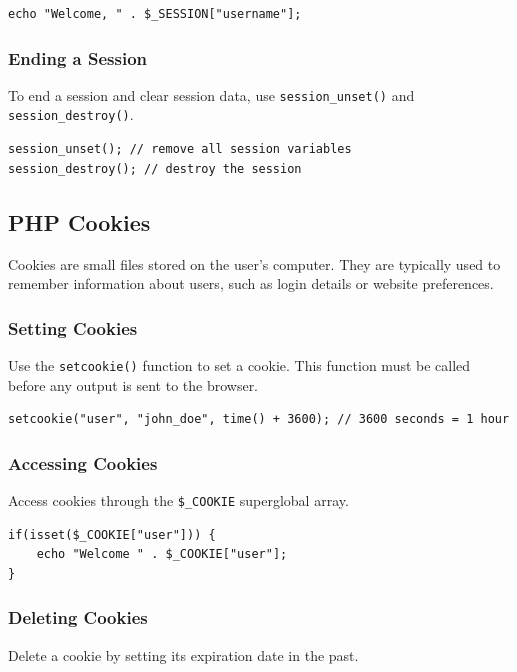 \documentclass[11pt]{article}
\begin{document}
\begin{verbatim}
echo "Welcome, " . $_SESSION["username"];
\end{verbatim}

\subsubsection{Ending a Session}
\label{sec:org89c14b4}
To end a session and clear session data, use \texttt{session\_unset()} and
\texttt{session\_destroy()}.

\begin{verbatim}
session_unset(); // remove all session variables
session_destroy(); // destroy the session
\end{verbatim}

\subsection{PHP Cookies}
\label{sec:orgf9a2e25}
Cookies are small files stored on the user's computer. They are
typically used to remember information about users, such as login
details or website preferences.

\subsubsection{Setting Cookies}
\label{sec:orgfe84655}
Use the \texttt{setcookie()} function to set a cookie. This function must be
called before any output is sent to the browser.

\begin{verbatim}
setcookie("user", "john_doe", time() + 3600); // 3600 seconds = 1 hour
\end{verbatim}

\subsubsection{Accessing Cookies}
\label{sec:org70d8ce5}
Access cookies through the \texttt{\$\_COOKIE} superglobal array.

\begin{verbatim}
if(isset($_COOKIE["user"])) {
    echo "Welcome " . $_COOKIE["user"];
}
\end{verbatim}

\subsubsection{Deleting Cookies}
\label{sec:orgf5898fe}
Delete a cookie by setting its expiration date in the past.
\end{document}
